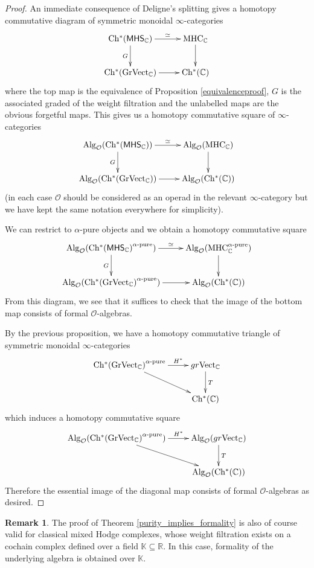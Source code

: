 \documentclass[a4paper]{amsart}
\theoremstyle{definition}
\newtheorem{rema}[theo]{Remark}
\theoremstyle{theorem}
\newcommand{\CC}{\mathbb{C}}
\newcommand{\KK}{\mathbb{K}}
\newcommand{\RR}{\mathbb{R}}
\newcommand{\Oo}{\mathcal{O}}
\newcommand{\ch}[1]{\mathrm{Ch^*({#1})}}
\newcommand{\MHS}{{\mathsf{MHS}}}
\newcommand{\MHC}{{\mathrm{MHC}}}
\newcommand{\Vect}{\mathrm{Vect}}
\newcommand{\Alg}{\mathrm{Alg}}
\begin{document}
\begin{proof}
An immediate consequence of Deligne's splitting gives a homotopy commutative diagram of symmetric monoidal $\infty$-categories
\[\xymatrix{
\ch{\MHS_\CC}\ar[r]^-{\simeq}\ar[d]_{G}&\MHC_{\CC}\ar[d]\\
\ch{Gr\Vect_{\CC}}\ar[r]&\ch{\CC}
}
\]
where the top map is the equivalence of Proposition \ref{equivalenceproof}, $G$ is the associated graded of the weight filtration and the unlabelled maps are the obvious forgetful maps.
This gives us a homotopy commutative square of $\infty$-categories
\[\xymatrix{
\Alg_{\Oo}(\ch{\MHS_\CC})\ar[r]^-{\simeq}\ar[d]_{G}&\Alg_{\Oo}(\MHC_{\CC})\ar[d]\\
\Alg_{\Oo}(\ch{Gr\Vect_{\CC}})\ar[r]&\Alg_{\Oo}(\ch{\CC})
}
\]
(in each case $\Oo$ should be considered as an operad in the relevant $\infty$-category but we have kept the same notation everywhere for simplicity).

We can restrict to $\alpha$-pure objects and we obtain a homotopy commutative square
\[\xymatrix{
\Alg_{\Oo}(\ch{\MHS_\CC}^{\alpha\text{-pure}})\ar[r]^-{\simeq}\ar[d]_{G}&\Alg_{\Oo}(\MHC_{\CC}^{\alpha\text{-pure}})\ar[d]\\
\Alg_{\Oo}(\ch{Gr\Vect_{\CC}}^{\alpha\text{-pure}})\ar[r]&\Alg_{\Oo}(\ch{\CC})
}
\]
From this diagram, we see that it suffices to check that the image of the bottom map consists of formal $\Oo$-algebras. 

By the previous proposition, we have a homotopy commutative triangle of symmetric monoidal $\infty$-categories
\[\xymatrix{
\ch{Gr\Vect_\CC}^{\alpha\text{-pure}}\ar[r]^-{H^*}\ar[dr]&gr\Vect_{\CC}\ar[d]^T\\
 &\ch{\CC}
}
\]
which induces a homotopy commutative square
\[\xymatrix{
\Alg_{\Oo}(\ch{Gr\Vect_\CC}^{\alpha\text{-pure}})\ar[r]^-{H^*}\ar[dr]&\Alg_{\Oo}(gr\Vect_{\CC})\ar[d]^T\\
 &\Alg_{\Oo}(\ch{\CC})
}
\]
Therefore the essential image of the diagonal map consists of formal $\Oo$-algebras as desired.
\end{proof}



\begin{rema}
 The proof of Theorem \ref{purity_implies_formality} is also of course valid for classical mixed Hodge complexes, whose weight filtration exists on a cochain complex defined over a field $\KK\subseteq \RR$. In this case, formality of the underlying algebra is obtained over $\KK$.
\end{rema}
\end{document}
